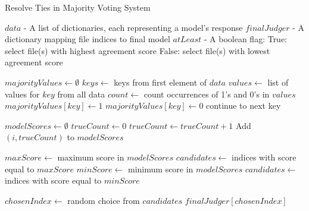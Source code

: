 \begin{algorithm}
    \caption{Resolve Ties in Majority Voting System}
    \begin{algorithmic}[1]
        \Require
        \Statex $data$ - A list of dictionaries, each representing a model's response
        \Statex $finalJudger$ - A dictionary mapping file indices to final model
        \Statex $atLeast$ - A boolean flag:
        \Statex \hspace{1em} True: select file(s) with highest agreement score
        \Statex \hspace{1em} False: select file(s) with lowest agreement score

            \State $majorityValues \gets \emptyset$
            \State $keys \gets $ keys from first element of $data$
                \State $values \gets $ list of values for $key$ from all data
                \State $count \gets $ count occurrences of 1's and 0's in $values$
                    \State $majorityValues[key] \gets 1$
                \State $majorityValues[key] \gets 0$
                \Else
                    \State continue to next key
                \EndIf
            \EndFor

            \State $modelScores \gets \emptyset$
                \State $trueCount \gets 0$
                        \State $trueCount \gets trueCount + 1$
                    \EndIf
                \EndFor
                \State Add $(i, trueCount)$ to $modelScores$
            \EndFor

                \State $maxScore \gets $ maximum score in $modelScores$
                \State $candidates \gets $ indices with score equal to $maxScore$
            \Else
                \State $minScore \gets $ minimum score in $modelScores$
                \State $candidates \gets $ indices with score equal to $minScore$
            \EndIf

            \State $chosenIndex \gets $ random choice from $candidates$
            \State \Return $finalJudger[chosenIndex]$
        \EndProcedure
    \end{algorithmic}\label{alg:model-selection}
\end{algorithm}
%
